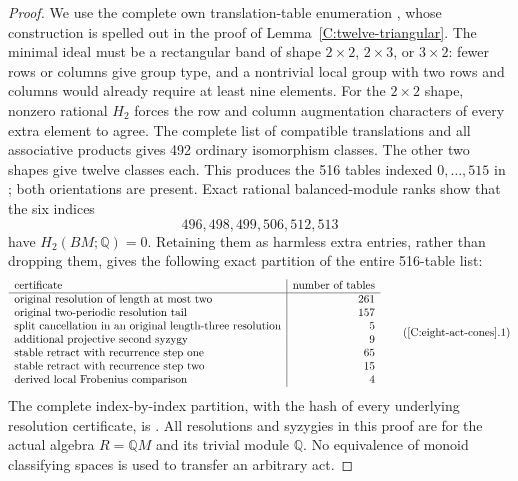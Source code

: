 \begin{proof}
We use the complete own translation-table enumeration
, whose construction is
spelled out in the proof of Lemma~\ref{C:twelve-triangular}.
The minimal ideal must be a rectangular band of shape
$2\times2$, $2\times3$, or $3\times2$: fewer rows or columns
give group type, and a nontrivial local group with two rows
and columns would already require at least nine elements.
For the $2\times2$ shape, nonzero rational $H_2$ forces the
row and column augmentation characters of every extra element
to agree. The complete list of compatible translations and
all associative products gives 492 ordinary isomorphism
classes. The other two shapes give twelve classes each.
This produces the 516 tables indexed $0,\ldots,515$ in
; both orientations
are present. Exact rational balanced-module ranks show that
the six indices
\[
 496,498,499,506,512,513
\]
have $H_2(BM;\mathbb Q)=0$. Retaining them as harmless extra
entries, rather than dropping them, gives the following exact
partition of the entire 516-table list:
\[
\begin{array}{l|r}
 \text{certificate}&\text{number of tables}\\ \hline
 \text{original resolution of length at most two}&261\\
 \text{original two-periodic resolution tail}&157\\
 \text{split cancellation in an original length-three resolution}&5\\
 \text{additional projective second syzygy}&9\\
 \text{stable retract with recurrence step one}&65\\
 \text{stable retract with recurrence step two}&15\\
 \text{derived local Frobenius comparison}&4
\end{array}                                                     \tag{\ref{C:eight-act-cones}.1}\label{eq:C-eight-partition}
\]
The complete index-by-index partition, with the hash of every
underlying resolution certificate, is
.
All resolutions and syzygies in this proof are for the actual
algebra $R=\mathbb QM$ and its trivial module $\mathbb Q$.
No equivalence of monoid classifying spaces is used to transfer
an arbitrary act.


\end{proof}
